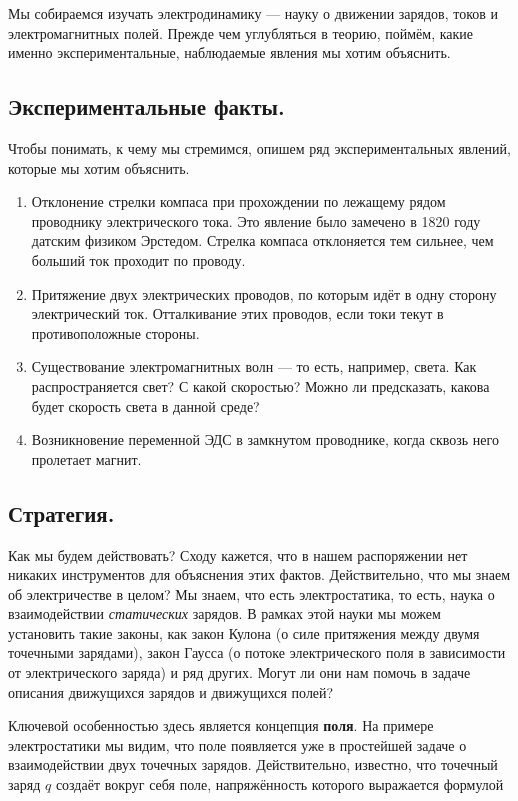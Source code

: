 \documentclass[a4paper,12pt]{article}
\numberwithin{equation}{section}
\begin{document}
Мы собираемся изучать электродинамику --- науку о движении зарядов,
токов и электромагнитных полей. Прежде чем углубляться в теорию,
поймём, какие именно экспериментальные, наблюдаемые явления мы хотим
объяснить. 

\subsection{Экспериментальные факты.}
\label{sec:exp_facts}

Чтобы понимать, к чему мы стремимся, опишем ряд экспериментальных
явлений, которые мы хотим объяснить. 

\begin{enumerate}
\item Отклонение стрелки компаса при прохождении по лежащему рядом
  проводнику электрического тока. Это явление было замечено в 1820
  году датским физиком Эрстедом. Стрелка компаса отклоняется тем
  сильнее, чем больший ток проходит по проводу.
\item Притяжение двух электрических проводов, по которым идёт в одну
  сторону электрический ток. Отталкивание этих проводов, если токи
  текут в противоположные стороны.
\item Существование электромагнитных волн --- то есть, например,
  света. Как распространяется свет? С какой скоростью? Можно ли
  предсказать, какова будет скорость света в данной среде?
\item Возникновение переменной ЭДС в замкнутом проводнике, когда сквозь него
  пролетает магнит.
\end{enumerate}

\subsection{Стратегия.}
\label{sec:strategy}

Как мы будем действовать? Сходу кажется, что в нашем распоряжении нет
никаких инструментов для объяснения этих фактов. Действительно, что мы
знаем об электричестве в целом? Мы знаем, что есть электростатика, то
есть, наука о взаимодействии \textit{статических} зарядов. В рамках
этой науки мы можем установить такие законы, как закон Кулона (о силе
притяжения между двумя точечными зарядами), закон Гаусса (о потоке
электрического поля в зависимости от электрического заряда) и ряд
других. Могут ли они нам помочь в задаче описания движущихся зарядов и
движущихся полей? 

Ключевой особенностью здесь является концепция \textbf{поля}. На
примере электростатики мы видим, что поле появляется уже в простейшей
задаче о взаимодействии двух точечных зарядов. Действительно,
известно, что точечный заряд $q$ создаёт вокруг себя поле,
напряжённость которого выражается формулой 
\end{document}
